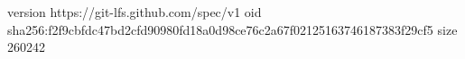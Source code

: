version https://git-lfs.github.com/spec/v1
oid sha256:f2f9cbfdc47bd2cfd90980fd18a0d98ce76c2a67f02125163746187383f29cf5
size 260242
